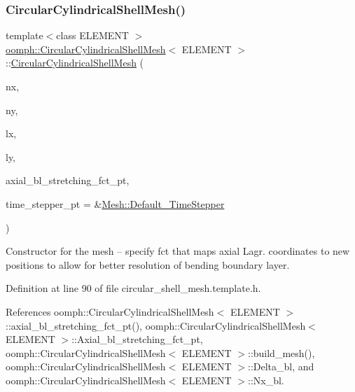 \subsubsection{\texorpdfstring{Circular\+Cylindrical\+Shell\+Mesh()}{CircularCylindricalShellMesh()}\hspace{0.1cm}{\footnotesize\ttfamily [2/3]}}
{\footnotesize\ttfamily template$<$class E\+L\+E\+M\+E\+NT $>$ \\
\hyperlink{classoomph_1_1CircularCylindricalShellMesh}{oomph\+::\+Circular\+Cylindrical\+Shell\+Mesh}$<$ E\+L\+E\+M\+E\+NT $>$\+::\hyperlink{classoomph_1_1CircularCylindricalShellMesh}{Circular\+Cylindrical\+Shell\+Mesh} (\begin{DoxyParamCaption}\item[{const unsigned \&}]{nx,  }\item[{const unsigned \&}]{ny,  }\item[{const double \&}]{lx,  }\item[{const double \&}]{ly,  }\item[{\hyperlink{classoomph_1_1CircularCylindricalShellMesh_a770336fa72e8911f31b9fe3f70197a51}{Axial\+B\+L\+Stretching\+Fct\+Pt}}]{axial\+\_\+bl\+\_\+stretching\+\_\+fct\+\_\+pt,  }\item[{\hyperlink{classoomph_1_1TimeStepper}{Time\+Stepper} $\ast$}]{time\+\_\+stepper\+\_\+pt = {\ttfamily \&\hyperlink{classoomph_1_1Mesh_a12243d0fee2b1fcee729ee5a4777ea10}{Mesh\+::\+Default\+\_\+\+Time\+Stepper}} }\end{DoxyParamCaption})\hspace{0.3cm}{\ttfamily [inline]}}



Constructor for the mesh -- specify fct that maps axial Lagr. coordinates to new positions to allow for better resolution of bending boundary layer. 



Definition at line 90 of file circular\+\_\+shell\+\_\+mesh.\+template.\+h.



References oomph\+::\+Circular\+Cylindrical\+Shell\+Mesh$<$ E\+L\+E\+M\+E\+N\+T $>$\+::axial\+\_\+bl\+\_\+stretching\+\_\+fct\+\_\+pt(), oomph\+::\+Circular\+Cylindrical\+Shell\+Mesh$<$ E\+L\+E\+M\+E\+N\+T $>$\+::\+Axial\+\_\+bl\+\_\+stretching\+\_\+fct\+\_\+pt, oomph\+::\+Circular\+Cylindrical\+Shell\+Mesh$<$ E\+L\+E\+M\+E\+N\+T $>$\+::build\+\_\+mesh(), oomph\+::\+Circular\+Cylindrical\+Shell\+Mesh$<$ E\+L\+E\+M\+E\+N\+T $>$\+::\+Delta\+\_\+bl, and oomph\+::\+Circular\+Cylindrical\+Shell\+Mesh$<$ E\+L\+E\+M\+E\+N\+T $>$\+::\+Nx\+\_\+bl.

